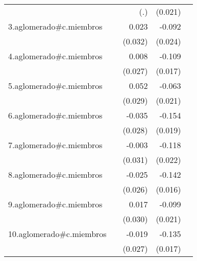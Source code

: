 {\begin{longtable}{l*{4}{D{.}{.}{-1}}}
            &                     &         (.)         &     (0.021)         &                     \\
\addlinespace
3.aglomerado#c.miembros&                     &       0.023         &      -0.092\sym{***}&                     \\
            &                     &     (0.032)         &     (0.024)         &                     \\
\addlinespace
4.aglomerado#c.miembros&                     &       0.008         &      -0.109\sym{***}&                     \\
            &                     &     (0.027)         &     (0.017)         &                     \\
\addlinespace
5.aglomerado#c.miembros&                     &       0.052         &      -0.063\sym{**} &                     \\
            &                     &     (0.029)         &     (0.021)         &                     \\
\addlinespace
6.aglomerado#c.miembros&                     &      -0.035         &      -0.154\sym{***}&                     \\
            &                     &     (0.028)         &     (0.019)         &                     \\
\addlinespace
7.aglomerado#c.miembros&                     &      -0.003         &      -0.118\sym{***}&                     \\
            &                     &     (0.031)         &     (0.022)         &                     \\
\addlinespace
8.aglomerado#c.miembros&                     &      -0.025         &      -0.142\sym{***}&                     \\
            &                     &     (0.026)         &     (0.016)         &                     \\
\addlinespace
9.aglomerado#c.miembros&                     &       0.017         &      -0.099\sym{***}&                     \\
            &                     &     (0.030)         &     (0.021)         &                     \\
\addlinespace
10.aglomerado#c.miembros&                     &      -0.019         &      -0.135\sym{***}&                     \\
            &                     &     (0.027)         &     (0.017)         &                     \\

\end{longtable}}

